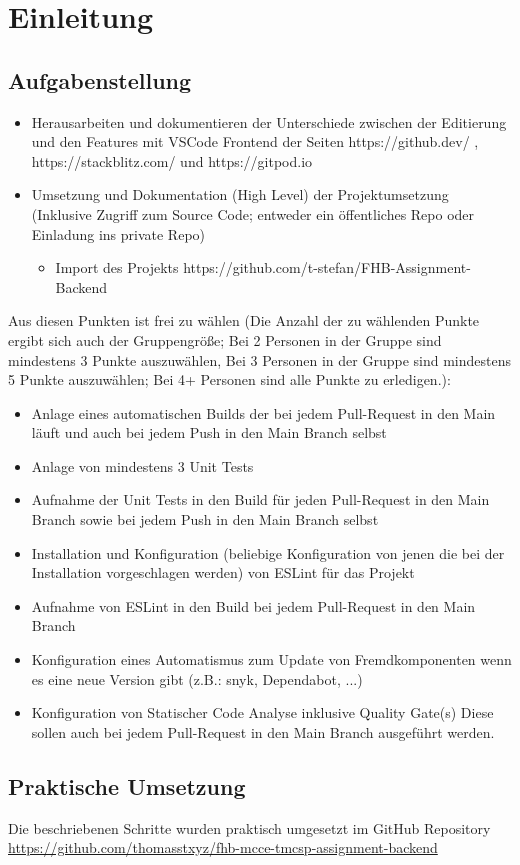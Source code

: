 \section{Einleitung}

\subsection{Aufgabenstellung}

\begin{itemize}
	\item Herausarbeiten und dokumentieren der Unterschiede zwischen der Editierung und den
	Features mit VSCode Frontend der Seiten https://github.dev/ , https://stackblitz.com/ und
	https://gitpod.io
	\item Umsetzung und Dokumentation (High Level) der Projektumsetzung (Inklusive Zugriff zum
	Source Code; entweder ein öffentliches Repo oder Einladung ins private Repo)
	\begin{itemize}
		\item Import des Projekts https://github.com/t-stefan/FHB-Assignment-Backend
	\end{itemize}
\end{itemize}

\noindent
Aus diesen Punkten ist frei zu wählen (Die Anzahl der zu wählenden Punkte ergibt sich auch der
Gruppengröße; Bei 2 Personen in der Gruppe sind mindestens 3 Punkte auszuwählen, Bei 3
Personen in der Gruppe sind mindestens 5 Punkte auszuwählen; Bei 4+ Personen sind alle Punkte zu
erledigen.): 

\begin{itemize}
	\item Anlage eines automatischen Builds der bei jedem Pull-Request in den Main läuft und
	auch bei jedem Push in den Main Branch selbst
	\item Anlage von mindestens 3 Unit Tests
	\item Aufnahme der Unit Tests in den Build für jeden Pull-Request in den Main Branch
	sowie bei jedem Push in den Main Branch selbst
	\item Installation und Konfiguration (beliebige Konfiguration von jenen die bei der
	Installation vorgeschlagen werden) von ESLint für das Projekt
	\item Aufnahme von ESLint in den Build bei jedem Pull-Request in den Main Branch
	\item Konfiguration eines Automatismus zum Update von Fremdkomponenten wenn es
	eine neue Version gibt (z.B.: snyk, Dependabot, ...)
	\item Konfiguration von Statischer Code Analyse inklusive Quality Gate(s)
	Diese sollen auch bei jedem Pull-Request in den Main Branch ausgeführt werden.
\end{itemize}

\subsection{Praktische Umsetzung}
Die beschriebenen Schritte wurden praktisch umgesetzt im GitHub Repository
\url{https://github.com/thomasstxyz/fhb-mcce-tmcsp-assignment-backend}

\clearpage

